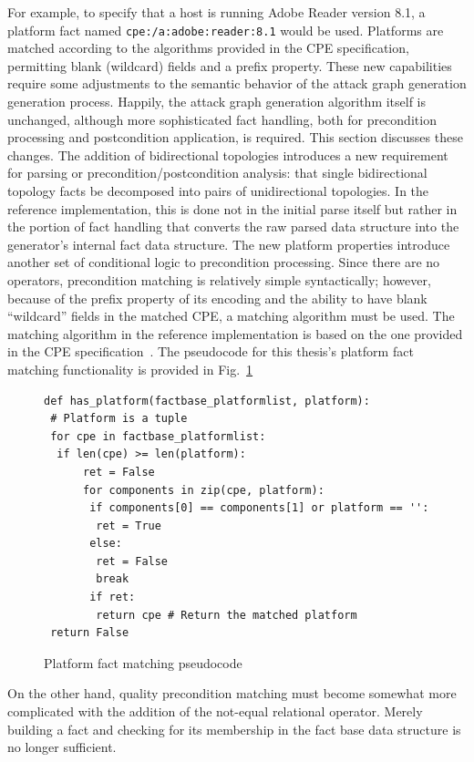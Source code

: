 For example, to specify that a host is running Adobe Reader version 8.1, a 
platform fact named \texttt{cpe:/a:adobe:reader:8.1} would be used. Platforms
are matched according to the algorithms provided in the CPE specification,
permitting blank (wildcard) fields and a prefix property.
These new capabilities require some adjustments to the semantic behavior of the
attack graph generation generation process. Happily, the attack graph generation
algorithm itself is unchanged, although more sophisticated fact handling,
both for precondition processing and postcondition application,
is required. This section discusses these changes.
The addition of bidirectional topologies introduces a new requirement for
parsing or precondition/postcondition analysis: that single bidirectional 
topology facts be decomposed into pairs
of unidirectional topologies. In the reference implementation, this is done
not in the initial parse itself but rather in the portion of fact handling that
converts the raw parsed data structure into the generator's internal fact
data structure.
The new platform properties introduce another set of conditional logic to
precondition processing. Since there are no operators, precondition matching
is relatively simple syntactically; however, because of the prefix
property of its encoding and the ability to have blank ``wildcard'' fields
in the matched CPE, a matching algorithm must be used. The matching algorithm
in the reference implementation is based on the one provided in the CPE
specification~\cite{buttner2009common}.
The pseudocode for this thesis's platform fact matching functionality is
provided in Fig.~\ref{fig:cpe_match_pc}

\begin{figure}
\begin{lstlisting}
def has_platform(factbase_platformlist, platform):
 # Platform is a tuple
 for cpe in factbase_platformlist:
  if len(cpe) >= len(platform):
      ret = False
      for components in zip(cpe, platform):
       if components[0] == components[1] or platform == '':
        ret = True
       else:
        ret = False
        break
       if ret:
        return cpe # Return the matched platform
 return False
\end{lstlisting}
\caption{Platform fact matching pseudocode}
\label{fig:cpe_match_pc}
\end{figure}
On the other hand, quality precondition matching must become
somewhat more complicated with the addition of the not-equal relational
operator. Merely building a fact and checking for its membership in the
fact base data structure is no longer sufficient. 

